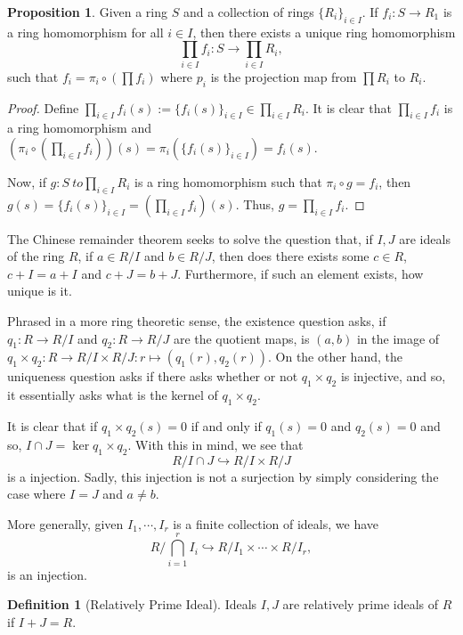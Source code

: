 \documentclass[]{article}
\theoremstyle{definition}
\theoremstyle{definition}
\newtheorem{definition}{Definition}[section]
\newtheorem{proposition}{Proposition}[section]
\begin{document}
\begin{proposition}
  Given a ring \(S\) and a collection of rings \(\{R_i\}_{i \in I}\). If 
  \(f_i : S \to R_1\) is a ring homomorphism for all \(i \in I\), then there exists 
  a unique ring homomorphism 
  \[\prod_{i \in I} f_i : S \to \prod_{i \in I} R_i,\]
  such that \(f_i = \pi_i \circ (\prod f_i)\) where \(p_i\) is the projection map 
  from \(\prod R_i\) to \(R_i\).
\end{proposition}
\begin{proof}
  Define \(\prod_{i \in I} f_i(s) := \{f_i(s)\}_{i \in I} \in \prod_{i \in I} R_i\).
  It is clear that \(\prod_{i \in I} f_i\) is a ring homomorphism and 
  \((\pi_i \circ (\prod_{i \in I} f_i))(s) = \pi_i(\{f_i(s)\}_{i \in I}) = f_i(s)\).

  Now, if \(g : S\ to \prod_{i \in I} R_i\) is a ring homomorphism such that 
  \(\pi_i \circ g = f_i\), then \(g(s) = \{f_i(s)\}_{i \in I} = 
  (\prod_{i \in I} f_i)(s)\). Thus, \(g = \prod_{i \in I} f_i\).
\end{proof}

The Chinese remainder theorem seeks to solve the question that, if \(I, J\) 
are ideals of the ring \(R\), if \(a \in R / I\) and \(b \in R / J\), then 
does there exists some \(c \in R\), \(c + I = a + I\) and \(c + J = b + J\).
Furthermore, if such an element exists, how unique is it.

Phrased in a more ring theoretic sense, the existence question asks, 
if \(q_1 : R \to R / I\) and \(q_2 : R \to R / J\) are the quotient maps, 
is \((a, b)\) in the image of 
\(q_1 \times q_2 : R \to R / I \times R / J : r \mapsto (q_1(r), q_2(r))\). 
On the other hand, the uniqueness question asks if there asks whether or not 
\(q_1 \times q_2\) is injective, and so, it essentially asks what is the 
kernel of \(q_1 \times q_2\).

It is clear that if \(q_1 \times q_2(s) = 0\) if and only if 
\(q_1(s) = 0\) and \(q_2(s) = 0\) and so, \(I \cap J = \ker q_1 \times q_2\).
With this in mind, we see that 
\[R / I \cap J \hookrightarrow R / I \times R / J\]
is a injection. Sadly, this injection is not a surjection by simply considering 
the case where \(I = J\) and \(a \neq b\). 

More generally, given \(I_1, \cdots, I_r\) is a finite collection of ideals, 
we have 
\[R / \bigcap_{i = 1}^r I_i \hookrightarrow R / I_1 \times \cdots \times R / I_r,\]
is an injection.

\begin{definition}[Relatively Prime Ideal]
  Ideals \(I, J\) are relatively prime ideals of \(R\) if \(I + J = R\).
\end{definition}
\end{document}
